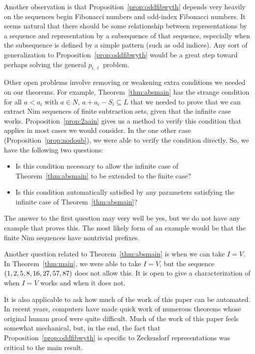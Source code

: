 \documentclass[english,12pt]{article}
\newcommand{\seq}{\p}
\begin{document}
Another observation is that Proposition~\ref{prop:oddfibwyth} depends very heavily on the sequences begin Fibonacci numbers and odd-index Fibonacci numbers.  It seems natural that there should be some relationship between representations by a sequence and representation by a subsequence of that sequence, especially when the subsequence is defined by a simple pattern (such as odd indices).  Any sort of generalization to Proposition~\ref{prop:oddfibwyth} would be a great step toward perhaps solving the general $p_{i,\ell}$ problem.

Other open problems involve removing or weakening extra conditions we needed on our theorems.  For example, Theorem~\ref{thm:absmain} has the strange condition for all $a<a_i$ with $a\in N$, $a+a_i-S_i\subseteq L$ that we needed to prove that we can extract Nim sequences of finite subtraction sets, given that the infinite case works.  Proposition~\ref{prop:2aain} gives us a method to verify this condition that applies in most cases we would consider.  In the one other case (Proposition~\ref{prop:nodoub}), we were able to verify the condition directly.  So, we have the following two questions:
\begin{itemize}
\item Is this condition necessary to allow the infinite case of Theorem~\ref{thm:absmain} to be extended to the finite case?
\item Is this condition automatically satisfied by any parameters satisfying the infinite case of Theorem~\ref{thm:absmain}?
\end{itemize}
The answer to the first question may very well be yes, but we do not have any example that proves this.  The most likely form of an example would be that the finite Nim sequences have nontrivial prefixes.

Another question related to Theorem~\ref{thm:absmain} is when we can take $I=V$.  In Theorem~\ref{thm:main}, we were able to take $I=V$, but the sequence $\seq{1,2,5,8,16,27,57,87}$ does not allow this.  It is open to give a characterization of when $I=V$ works and when it does not.

It is also applicable to ask how much of the work of this paper can be automated.  In recent years, computers have made quick work of numerous theorems whose original human proof were quite difficult.  Much of the work of this paper feels somewhat mechanical, but, in the end, the fact that Proposition~\ref{prop:oddfibwyth} is specific to Zeckendorf representations was critical to the main result.
\end{document}
